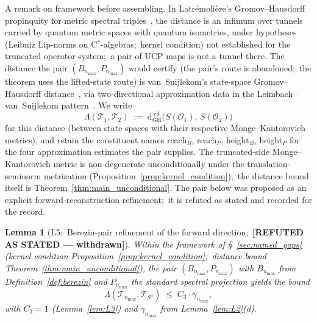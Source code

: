 \documentclass[11pt,a4paper]{article}
\theoremstyle{plain}
\newtheorem{lemma}[theorem]{Lemma}
\theoremstyle{definition}
\newcommand{\nmax}{n_{\max}}
\newcommand{\sthree}{S^{3}}
\newcommand{\Op}{\mathcal{O}}
\newcommand{\Tcal}{\mathcal{T}}
\begin{document}
A remark on framework before assembling. In Latr\'emoli\`ere's
Gromov--Hausdorff propinquity for metric spectral
triples~\cite{latremoliere_metric_st_2017}, the
distance is an infimum over tunnels carried by quantum metric spaces
with quantum isometries, under hypotheses (Leibniz Lip-norms on
C$^{*}$-algebras;\ kernel condition) not established for the
truncated operator system;\ a pair of UCP maps is not a tunnel there.
The distance the pair $(B_{\nmax}, P_{\nmax})$ would certify (the pair's route is abandoned;\ the theorem uses the lifted-state route) is
van~Suijlekom's state-space Gromov--Hausdorff
distance~\cite{vs2021_jgp}, via two-directional approximation data in
the Leimbach--van~Suijlekom pattern~\cite{leimbach_vs2024}. We write
\begin{equation}\label{eq:propinquity_def}
   \Lambda(\Tcal_1, \Tcal_2)
   \;:=\; \mathrm{d}_{\mathrm{GH}}^{\,\mathrm{vS}}\!\bigl(
      S(\Op_{1}),\, S(\Op_{2})\bigr)
\end{equation}
for this distance (between state spaces with their respective
Monge--Kantorovich metrics), and retain the constituent names
reach$_{B}$, reach$_{P}$, height$_{B}$, height$_{P}$ for the four
approximation estimates the pair supplies. The truncated-side
Monge--Kantorovich metric is non-degenerate unconditionally under the
translation-seminorm metrization
(Proposition~\ref{prop:kernel_condition});\ the distance bound itself
is Theorem~\ref{thm:main_unconditional}.  The pair below was proposed
as an explicit forward-reconstruction refinement;\ it is refuted as
stated and recorded for the record.

\begin{lemma}[L5:\ Berezin-pair refinement of the forward
direction;\ \textbf{[REFUTED AS STATED --- withdrawn]}]\label{lem:L5}
Within the framework of \S~\ref{sec:named_gaps} (kernel condition
Proposition~\ref{prop:kernel_condition};\ distance bound
Theorem~\ref{thm:main_unconditional}), the pair
$(B_{\nmax}, P_{\nmax})$ with $B_{\nmax}$ from
Definition~\ref{def:berezin} and $P_{\nmax}$ the standard spectral
projection yields the bound
\begin{equation}\label{eq:L5_bound}
   \Lambda(\Tcal_{\nmax}, \Tcal_{\sthree})
   \;\le\; C_3 \cdot \gamma_{\nmax},
\end{equation}
with $C_3 = 1$ (Lemma~\ref{lem:L3}) and $\gamma_{\nmax}$ from
Lemma~\ref{lem:L2}(d).
\end{lemma}
\end{document}
